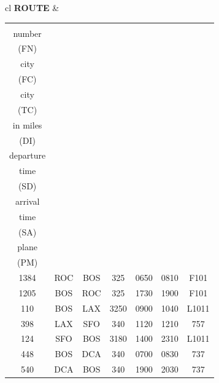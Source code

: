 \documentclass[12pt]{article}
\begin{document}
\begin{enumerate}
\begin{center}
\begin{tabular}{cl}
\textbf{ROUTE} & 
\begin{tabular}{ccccccc}
\shortstack{flight \\ number \\ (FN)} & 
\shortstack{from \\ city \\ (FC)} & 
\shortstack{to \\ city \\ (TC)} & 
\shortstack{distance \\ in miles \\ (DI)} & 
\shortstack{scheduled \\ departure \\ time \\ (SD)} & 
\shortstack{scheduled \\ arrival \\ time \\ (SA)} & 
\shortstack{ \\ plane \\ (PM)} \\
\hline
1384 & ROC & BOS & 325 & 0650 & 0810 & F101 \\
1205 & BOS & ROC & 325 & 1730 & 1900 & F101 \\
 110 & BOS & LAX & 3250 & 0900 & 1040 & L1011 \\
 398 & LAX & SFO & 340 & 1120 & 1210 & 757 \\
 124 & SFO & BOS & 3180 & 1400 & 2310 & L1011 \\
 448 & BOS & DCA & 340 & 0700 & 0830 & 737 \\
 540 & DCA & BOS & 340 & 1900 & 2030 & 737 \\
\end{tabular} \\
 \\ %
 \\


\end{tabular}
\end{center}
\end{enumerate}
\end{document}
